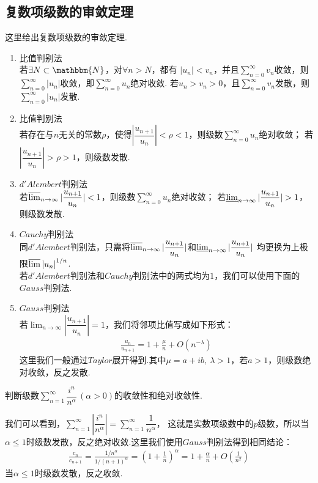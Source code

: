     \subsection{复数项级数的审敛定理}
    这里给出复数项级数的审敛定理.
    \begin{enumerate}
        \item 比值判别法\\
            若$\exists N \subset \mathbbm{N}$，对$\forall n > N$，都有
            $|u_n| < v_n$，并且$\sum_{n = 0}^{\infty}v_n$收敛，则$\sum_{n=0}^{\infty}|u_n|$收敛，即$\sum_{n=0}^{\infty}u_n$绝对收敛.
            若$u_n>v_n>0$，且$\sum_{n=0}^{\infty}v_n$发散，则$\sum_{n=0}^{\infty}|u_n|$发散.
        \item 比值判别法\\
            若存在与$n$无关的常数$\rho$，使得$\left|\dfrac{u_{n+1}}{u_n}\right|<\rho<1$，则级数$\sum_{n=0}^{\infty}u_n$绝对收敛；
            若$\left|\dfrac{u_{n+1}}{u_n}\right|>\rho>1$，则级数发散.
        \item $d'Alembert$判别法\\
            若$\varlimsup_{n\to\infty}|\dfrac{u_{n+1}}{u_n}|<1$，则级数$\sum_{n=0}^{\infty}u_n$绝对收敛；
            若$\varliminf_{n\to\infty}|\dfrac{u_{n+1}}{u_n}|>1$，则级数发散.
        \item $Cauchy$判别法\\
            同$d'Alembert$判别法，只需将$\varlimsup_{n\to\infty}|\dfrac{u_{n+1}}{u_n}|$和$\varliminf_{n\to\infty}|\dfrac{u_{n+1}}{u_n}|$
            均更换为上极限$\varlimsup{{|u_n|}^{1/n}}$.\\
            若$d'Alembert$判别法和$Cauchy$判别法中的两式均为$1$，我们可以使用下面的$Gauss$判别法.
        \item $Gauss$判别法\\
            若$\lim_{n\to\infty}|\dfrac{u_{n+1}}{u_n}|=1$，我们将邻项比值写成如下形式：
            \begin{align*}
                \frac{u_n}{u_{n+1}}=1+\frac{\mu}{n}+O(n^{-\lambda})
            \end{align*}
            这里我们一般通过$Taylor$展开得到.其中$\mu=a+ib,\ \lambda > 1$，若$a>1$，则级数绝对收敛，反之发散.
    \end{enumerate}
    \begin{example}
        判断级数$\sum_{n=1}^{\infty}\dfrac{i^n}{n^\alpha}\,(\alpha>0)$的收敛性和绝对收敛性.
    \end{example}
    \begin{solution}
        我们可以看到，$\sum_{n=1}^{\infty}|\dfrac{i^n}{n^\alpha}|=\sum_{n=1}^{\infty}\dfrac{1}{n^\alpha}$，
        这就是实数项级数中的$p$级数，所以当$\alpha\leq 1$时级数发散，反之绝对收敛.这里我们使用$Gauss$判别法得到相同结论：
        \begin{align*}
            \frac{c_n}{c_{n+1}}=\frac{1/n^\alpha}{1/(n+1)^\alpha}=\left( 1+\frac{1}{n} \right)^\alpha=1+\frac{\alpha}{n}+O\left(\frac{1}{n^2}\right)
        \end{align*}
        当$\alpha \leq 1$时级数发散，反之收敛.
    \end{solution}

